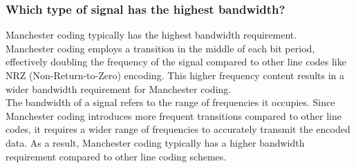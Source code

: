 \documentclass[a4paper, 12pt, english]{article}
\begin{document}
\newpage

\subsubsection{Which type of signal has the highest bandwidth?}
Manchester coding typically has the highest bandwidth requirement.\\
\noindent Manchester coding employs a transition in the middle of each bit period, effectively doubling the frequency of the signal compared to other line codes like NRZ (Non-Return-to-Zero) encoding. This higher frequency content results in a wider bandwidth requirement for Manchester coding.\\
\noindent The bandwidth of a signal refers to the range of frequencies it occupies. Since Manchester coding introduces more frequent transitions compared to other line codes, it requires a wider range of frequencies to accurately transmit the encoded data. As a result, Manchester coding typically has a higher bandwidth requirement compared to other line coding schemes.
\end{document}
